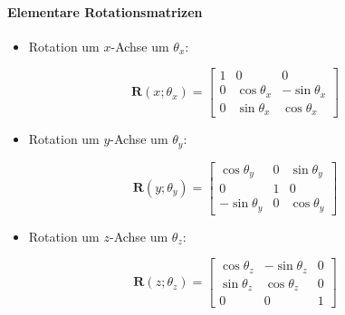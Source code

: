 \documentclass[a4paper, 11pt, accentcolor = tud3b]{tudreport}
\newcommand{\mat}[1]{\boldsymbol{#1}}
\begin{document}
				\paragraph{Elementare Rotationsmatrizen}
					\begin{itemize}
						\item Rotation um \(x\)-Achse um \(\theta_x\):
					\end{itemize}
					\begin{equation*}
						\mat{R}(x; \theta_x) =
							\begin{bmatrix}
								1 & 0            & 0             \\
								0 & \cos\theta_x & -\sin\theta_x \\
								0 & \sin\theta_x & \cos\theta_x
							\end{bmatrix}
					\end{equation*}
					\begin{itemize}
						\item Rotation um \(y\)-Achse um \(\theta_y\):
					\end{itemize}
					\begin{equation*}
						\mat{R}(y; \theta_y) =
							\begin{bmatrix}
								\cos\theta_y  & 0 & \sin\theta_y \\
								0             & 1 & 0            \\
								-\sin\theta_y & 0 & \cos\theta_y
							\end{bmatrix}
					\end{equation*}
					\begin{itemize}
						\item Rotation um \(z\)-Achse um \(\theta_z\):
					\end{itemize}
					\begin{equation*}
						\mat{R}(z; \theta_z) =
							\begin{bmatrix}
								\cos\theta_z & -\sin\theta_z & 0 \\
								\sin\theta_z & \cos\theta_z  & 0 \\
								0            & 0             & 1
							\end{bmatrix}
					\end{equation*}
\end{document}
